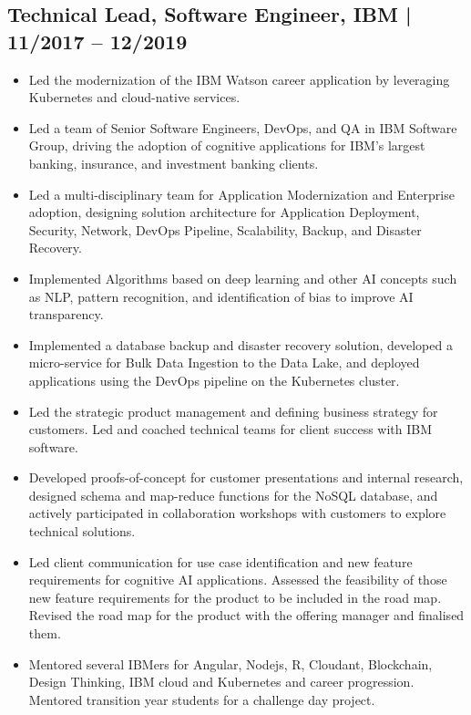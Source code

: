 \documentclass[12pt,parskip=half]{scrartcl}
\begin{document}
\subsection*{Technical Lead, Software Engineer, IBM | 11/2017 -- 12/2019}
\begin{itemize}
      \item Led the modernization of the IBM Watson career application by leveraging Kubernetes and cloud-native services. 
     \item Led a team of Senior Software Engineers, DevOps, and QA in IBM Software Group, driving the adoption of cognitive applications for IBM's largest banking, insurance, and investment banking clients.
     \item Led a multi-disciplinary team for Application Modernization and Enterprise adoption, designing solution architecture for Application Deployment, Security, Network, DevOps Pipeline, Scalability, Backup, and Disaster Recovery.
     \item Implemented Algorithms based on deep learning and other AI concepts such as NLP, pattern recognition, and identification of bias to improve AI transparency. 
     \item Implemented a database backup and disaster recovery solution, developed a micro-service for Bulk Data Ingestion to the Data Lake, and deployed applications using the DevOps pipeline on the Kubernetes cluster.
     \item Led the strategic product management and defining business strategy for customers. Led and coached technical teams for client success with IBM software.
     \item Developed proofs-of-concept for customer presentations and internal research, designed schema and map-reduce functions for the NoSQL database, and actively participated in collaboration workshops with customers to explore technical solutions.
     \item Led client communication for use case identification and new feature requirements for cognitive AI applications. Assessed the feasibility of those new feature requirements for the product to be included in the road map. Revised the road map for the product with the offering manager and finalised them.
    \item Mentored several IBMers for Angular, Nodejs, R, Cloudant, Blockchain, Design Thinking, IBM cloud and Kubernetes and career progression. Mentored transition year students for a challenge day project. 
    
\end{itemize}
\end{document}

